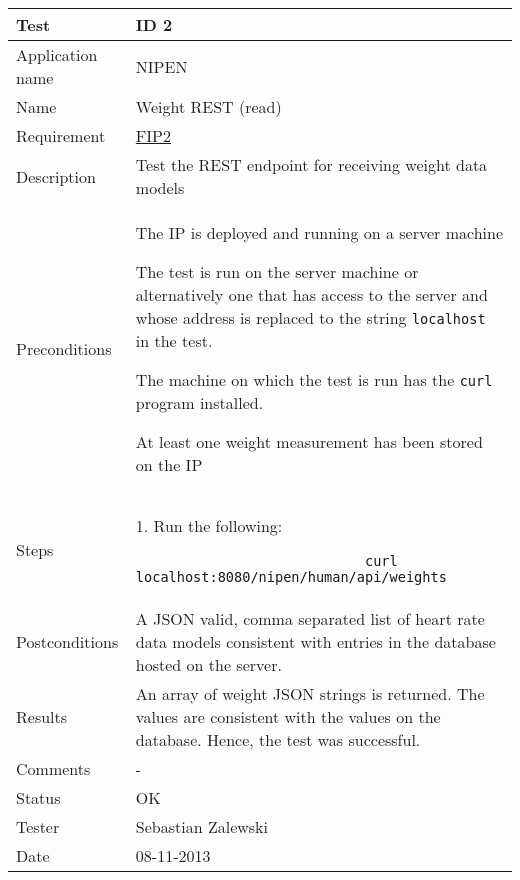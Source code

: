 \begin{table}
\begin{center}
\begin{tabular}{ | l | p{10cm} | }
	\hline
	\textbf{Test}	&	\textbf{ID 2} \\
	\hline\noalign{\smallskip}\noalign{\smallskip}\hline
	Application name	& NIPEN \\
	Name				& Weight REST (read) \\
	Requirement			& \hyperref[table:reqip]{FIP2} \\
	Description			& Test the REST endpoint for receiving weight data models \\
	Preconditions		&	\par The IP is deployed and running on a server machine
							\par The test is run on the server machine or alternatively
							one that has access to the server and whose address is replaced to the
							string \verb|localhost| in the test.
							\par The machine on which the test is run has the \verb|curl| program installed.
							\par At least one weight measurement has been stored on the IP \\
	Steps 				&	1. Run the following:
							\begin{verbatim}
							curl localhost:8080/nipen/human/api/weights
							\end{verbatim}
							\\
	Postconditions		& A JSON valid, comma separated list of heart rate data models consistent with 
							entries in the database hosted on the server. \\
	Results				& An array of weight JSON strings is returned. 
						  The values are consistent with the values on the database. 
						  Hence, the test was successful. \\
	Comments			& - \\
	Status				& OK \\
	Tester				& Sebastian Zalewski \\
	Date				& 08-11-2013 \\
	\hline
\end{tabular}
\end{center}
\end{table}

